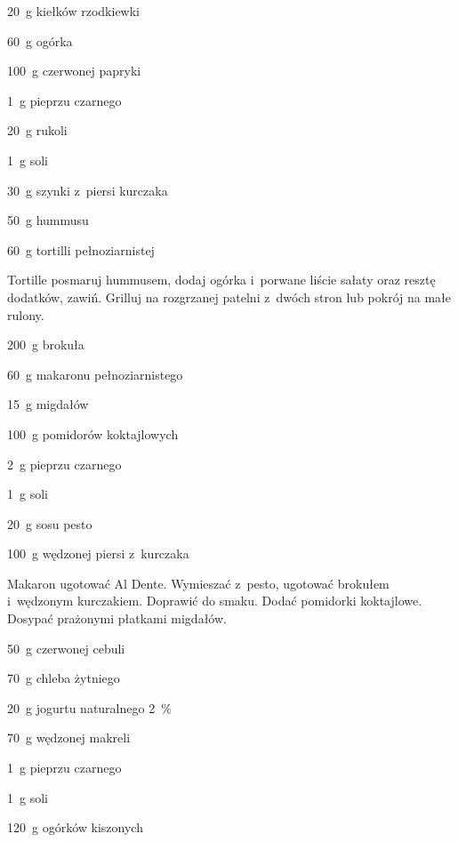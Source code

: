 \documentclass[../main.tex]{subfiles}
\begin{document}
\begin{Ingred}
    \item \qty{20}{\gram} kiełków rzodkiewki
    \item \qty{60}{\gram} ogórka
    \item \qty{100}{\gram} czerwonej papryki
    \item \qty{1}{\gram} pieprzu czarnego
    \item \qty{20}{\gram} rukoli
    \item \qty{1}{\gram} soli
    \item \qty{30}{\gram} szynki z~piersi kurczaka
    \item \qty{50}{\gram} hummusu
    \item \qty{60}{\gram} tortilli pełnoziarnistej
\end{Ingred}

Tortille posmaruj hummusem, dodaj ogórka i~porwane liście sałaty oraz resztę
dodatków, zawiń. Grilluj na rozgrzanej patelni z~dwóch stron lub pokrój na małe
rulony.


\begin{Ingred}
    \item \qty{200}{\gram} brokuła
    \item \qty{60}{\gram} makaronu pełnoziarnistego
    \item \qty{15}{\gram} migdałów
    \item \qty{100}{\gram} pomidorów koktajlowych
    \item \qty{2}{\gram} pieprzu czarnego
    \item \qty{1}{\gram} soli
    \item \qty{20}{\gram} sosu pesto
    \item \qty{100}{\gram} wędzonej piersi z~kurczaka
\end{Ingred}

Makaron ugotować Al Dente. Wymieszać z~pesto, ugotować brokułem i~wędzonym
kurczakiem. Doprawić do smaku. Dodać pomidorki koktajlowe. Dosypać prażonymi
płatkami migdałów.


\begin{Ingred}
    \item \qty{50}{\gram} czerwonej cebuli
    \item \qty{70}{\gram} chleba żytniego
    \item \qty{20}{\gram} jogurtu naturalnego \qty{2}{\percent}
    \item \qty{70}{\gram} wędzonej makreli
    \item \qty{1}{\gram} pieprzu czarnego
    \item \qty{1}{\gram} soli
    \item \qty{120}{\gram} ogórków kiszonych
\end{Ingred}
\end{document}
